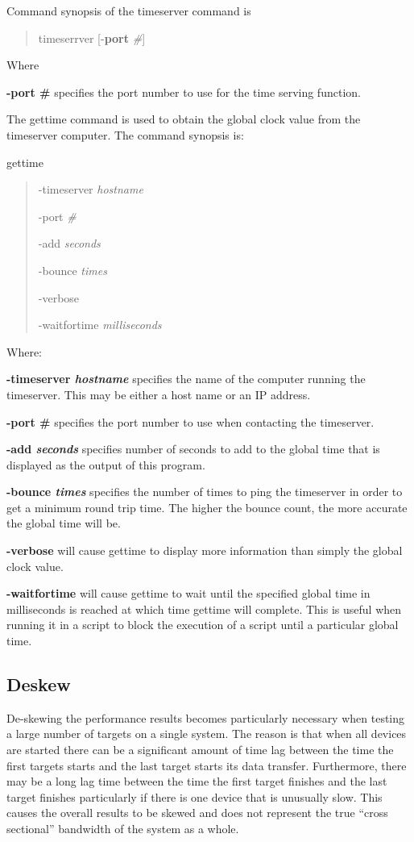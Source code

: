 Command synopsis of the timeserver command is

\begin{quote}
timeserrver {[}-\textbf{port} \emph{\#}{]}
\end{quote}

Where

\textbf{-port \#} specifies the port number to use for the time serving function.

The gettime command is used to obtain the global clock value from the timeserver computer. The command synopsis is:

gettime

\begin{quote}
-timeserver \emph{hostname}

-port \emph{\#}

-add \emph{seconds}

-bounce \emph{times}

-verbose

-waitfortime \emph{milliseconds}
\end{quote}

Where:

\textbf{-timeserver \emph{hostname }}specifies the name of the computer running the timeserver. This may be either a host name or an IP address.

\textbf{-port \#} specifies the port number to use when contacting the timeserver.

\textbf{-add \emph{seconds }}specifies number of seconds to add to the global time that is displayed as the output of this program.

\textbf{-bounce \emph{times}} specifies the number of times to ping the timeserver in order to get a minimum round trip time. The higher the bounce count, the more accurate the global time will be.

\textbf{-verbose} will cause gettime to display more information than simply the global clock value.

\textbf{-waitfortime} will cause gettime to wait until the specified global time in milliseconds is reached at which time gettime will complete. This is useful when running it in a script to block the execution of a script until a particular global time.

\subsection{Deskew}\label{deskew}

De-skewing the performance results becomes particularly necessary when testing a large number of targets on a single system. The reason is that when all devices are started there can be a significant amount of time lag between the time the first targets starts and the last target starts its data transfer. Furthermore, there may be a long lag time between the time the first target finishes and the last target finishes particularly if there is one device that is unusually slow. This causes the overall results to be skewed and does not represent the true ``cross sectional'' bandwidth of the system as a whole.

